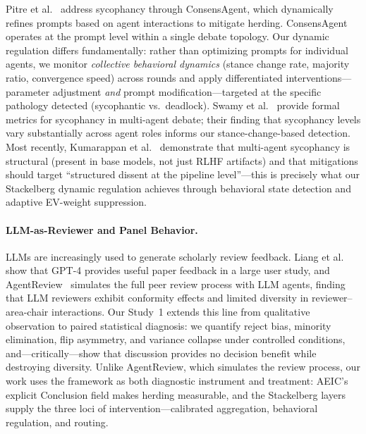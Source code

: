 Pitre et al.~\cite{pitre2025consensagent} address sycophancy through ConsensAgent, which dynamically refines prompts based on agent interactions to mitigate herding. ConsensAgent operates at the prompt level within a single debate topology. Our dynamic regulation differs fundamentally: rather than optimizing prompts for individual agents, we monitor \emph{collective behavioral dynamics} (stance change rate, majority ratio, convergence speed) across rounds and apply differentiated interventions---parameter adjustment \emph{and} prompt modification---targeted at the specific pathology detected (sycophantic vs.\ deadlock). Swamy et al.~\cite{swamy2025peacemaker} provide formal metrics for sycophancy in multi-agent debate; their finding that sycophancy levels vary substantially across agent roles informs our stance-change-based detection. Most recently, Kumarappan et al.~\cite{kumarappan2026alignment} demonstrate that multi-agent sycophancy is structural (present in base models, not just RLHF artifacts) and that mitigations should target ``structured dissent at the pipeline level''---this is precisely what our Stackelberg dynamic regulation achieves through behavioral state detection and adaptive EV-weight suppression.

\paragraph{LLM-as-Reviewer and Panel Behavior.}
LLMs are increasingly used to generate scholarly review feedback. Liang et al.~\cite{liang2024llmreview} show that GPT-4 provides useful paper feedback in a large user study, and AgentReview~\cite{jin2024agentreview} simulates the full peer review process with LLM agents, finding that LLM reviewers exhibit conformity effects and limited diversity in reviewer--area-chair interactions. Our Study~1 extends this line from qualitative observation to paired statistical diagnosis: we quantify reject bias, minority elimination, flip asymmetry, and variance collapse under controlled conditions, and---critically---show that discussion provides no decision benefit while destroying diversity. Unlike AgentReview, which simulates the review process, our work uses the framework as both diagnostic instrument and treatment: AEIC's explicit Conclusion field makes herding measurable, and the Stackelberg layers supply the three loci of intervention---calibrated aggregation, behavioral regulation, and routing.

